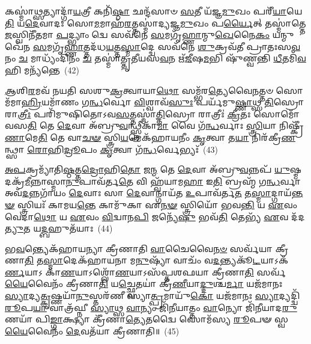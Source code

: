 𑌕𑌸𑍍𑌮𑌾॑\-\ul{𑌥𑍍𑌸}\-𑌤𑍍𑌯𑌾𑌦𑍍𑌗𑌾᳴\-\ul{𑌯}\-𑌤𑍍𑌰𑍀 𑌕𑌨𑌿᳴\-\ul{𑌷𑍍𑌠𑌾} 𑌛𑌨𑍍𑌦᳴𑌸𑌾𑍞 \ul{𑌸}\-𑌤𑍀 𑌯᳴𑌜𑍍𑌞\-\ul{𑌮𑍁}\-𑌖𑌂 𑌪𑌰𑍀᳴\-\ul{𑌯𑌾}\-𑌯𑍇\-\ul{𑌤𑌿} 𑌯\-\ul{𑌦𑍇}\-𑌵𑌾𑌦𑌃 𑌸𑍋\-\ul{𑌮}\-𑌮𑌾𑌹᳴\-\ul{𑌰}\-𑌤𑍍𑌤𑌸𑍍𑌮𑌾॑𑌦𑍍𑌯𑌜𑍍𑌞\-\ul{𑌮𑍁}\-𑌖𑌂 𑌪\-\ul{𑌰𑍍𑌯𑍈}\-𑌤𑍍 𑌤𑌸𑍍𑌮𑌾॑𑌤𑍍𑌤𑍇\-\ul{𑌜}\-𑌸𑍍𑌵𑌿𑌨𑍀᳴𑌤𑌮𑌾 \ul{𑌪}\-𑌦𑍍𑌭𑍍𑌯𑌾𑌂 𑌦𑍍𑌵𑍇 𑌸𑌵᳴𑌨𑍇 \ul{𑌸}\-𑌮𑌗𑍃᳴\-\ul{𑌹𑍍𑌣𑌾}\-𑌨𑍍𑌮𑍁\-\ul{𑌖𑍇}\-𑌨𑍈\-\ul{𑌕𑌂} 𑌯𑌨𑍍𑌮𑍁𑌖𑍇᳴𑌨 \ul{𑌸}\-𑌮𑌗𑍃᳴\-\ul{𑌹𑍍𑌣𑌾}\-𑌤𑍍𑌤𑌦᳴𑌧\-\ul{𑌯}\-𑌤𑍍𑌤\-\ul{𑌸𑍍𑌮𑌾}\-𑌦𑍍𑌦𑍍𑌵𑍇 𑌸𑌵᳴𑌨𑍇 \ul{𑌶𑍁}\-𑌕𑍍𑌰𑌵᳴𑌤𑍀 𑌪𑍍𑌰𑌾𑌤𑌃𑌸\-\ul{𑌵}\-𑌨𑌂 \ul{𑌚} 𑌮𑌾𑌧𑍍𑌯𑌂᳴𑌦𑌿𑌨𑌂 \ul{𑌚} 𑌤𑌸𑍍𑌮𑌾॑𑌤𑍍𑌤𑍃𑌤𑍀𑌯𑌸\-\ul{𑌵}\-𑌨 𑌋᳴\-\ul{𑌜𑍀}\-𑌷\-\ul{𑌮}\-𑌭𑌿 𑌷𑍁᳴𑌣𑍍𑌵𑌨𑍍𑌤𑌿 \ul{𑌧𑍀}\-𑌤𑌮𑌿᳴\-\ul{𑌵} 𑌹𑌿 𑌮𑌨𑍍𑌯᳴𑌨𑍍𑌤𑍇~(42)

\-\ul{𑌆}\-𑌶𑌿\-\ul{𑌰}\-𑌮𑌵᳴ 𑌨𑌯𑌤𑌿 𑌸𑌶𑍁\-\ul{𑌕𑍍𑌰}\-𑌤𑍍𑌵𑌾𑌯𑌾\-\ul{𑌥𑍋} 𑌸𑌮𑍍𑌭᳴𑌰\-\ul{𑌤𑍍𑌯𑍇}\-𑌵𑍈\-\ul{𑌨}\-𑌤𑍍𑌤𑍞 𑌸𑍋𑌮᳴𑌮𑌾\-\ul{𑌹𑍍𑌰𑌿}\-𑌯𑌮𑌾᳴𑌣𑌂 𑌗\-\ul{𑌨𑍍𑌧}\-𑌰𑍍𑌵𑍋 \ul{𑌵𑌿}\-𑌶𑍍𑌵𑌾𑌵᳴\-\ul{𑌸𑍁𑌃} 𑌪𑌰𑍍𑌯᳴𑌮𑍁\-\ul{𑌷𑍍𑌣𑌾}\-𑌥𑍍𑌸 \ul{𑌤𑌿}\-𑌸𑍍𑌰𑍋 𑌰𑌾\-\ul{𑌤𑍍𑌰𑍀𑌃} 𑌪𑌰𑌿᳴𑌮𑍁𑌷𑌿𑌤𑍋\-𑌽𑌵\-\ul{𑌸}\-𑌤𑍍𑌤𑌸𑍍𑌮𑌾॑\-\ul{𑌤𑍍𑌤𑌿}\-𑌸𑍍𑌰𑍋 𑌰𑌾𑌤𑍍𑌰𑍀𑌃॑ \ul{𑌕𑍍𑌰𑍀}\-𑌤𑌃 𑌸𑍋𑌮𑍋᳴ 𑌵𑌸\-\ul{𑌤𑌿} 𑌤𑍇 \ul{𑌦𑍇}\-𑌵𑌾 𑌅᳴𑌬𑍍𑌰𑍁\-\ul{𑌵}\-𑌨𑍍𑌥𑍍𑌸𑍍𑌤𑍍𑌰𑍀𑌕𑌾᳴\-\ul{𑌮𑌾} 𑌵𑍈 𑌗᳴\-\ul{𑌨𑍍𑌧}\-𑌰𑍍𑌵𑌾𑌃 \ul{𑌸𑍍𑌤𑍍𑌰𑌿}\-𑌯𑌾 𑌨𑌿𑌷𑍍𑌕𑍍𑌰𑍀᳴\-\ul{𑌣𑌾}\-𑌮𑍇\-\ul{𑌤𑌿} 𑌤𑍇 𑌵𑌾\-\ul{𑌚}\-\-\ul{𑍟} 𑌸𑍍𑌤𑍍𑌰𑌿\-\ul{𑌯}\-𑌮𑍇𑌕᳴𑌹𑌾𑌯𑌨𑍀𑌂 \ul{𑌕𑍃}\-𑌤𑍍𑌵𑌾 𑌤\-\ul{𑌯𑌾} 𑌨𑌿𑌰᳴𑌕𑍍𑌰𑍀\-\ul{𑌣}\-𑌨𑍍𑌥𑍍𑌸𑌾 \ul{𑌰𑍋}\-𑌹𑌿\-\ul{𑌦𑍍𑌰𑍂}\-𑌪𑌂 \ul{𑌕𑍃}\-𑌤𑍍𑌵𑌾 𑌗᳴\-\ul{𑌨𑍍𑌧}\-𑌰𑍍𑌵𑍇𑌭𑍍𑌯𑌃᳴~(43)

\-\ul{𑌅}\-\-\ul{𑌪}\-𑌕𑍍𑌰𑌮𑍍𑌯𑌾᳴𑌤𑌿\-\ul{𑌷𑍍𑌠}\-𑌤𑍍𑌤\-\ul{𑌦𑍍𑌰𑍋}\-𑌹𑌿\-\ul{𑌤𑍋} 𑌜\-\ul{𑌨𑍍𑌮} 𑌤𑍇 \ul{𑌦𑍇}\-𑌵𑌾 𑌅᳴𑌬𑍍𑌰𑍁\-\ul{𑌵}\-𑌨𑍍𑌨𑌪᳴ \ul{𑌯𑍁}\-𑌷𑍍𑌮𑌦𑌕𑍍𑌰᳴\-\ul{𑌮𑍀}\-𑌨𑍍𑌨𑌾𑌸𑍍𑌮𑌾\-\ul{𑌨𑍁}\-𑌪𑌾𑌵᳴𑌰𑍍𑌤\-\ul{𑌤𑍇} 𑌵𑌿 𑌹𑍍𑌵᳴𑌯𑌾𑌮\-\ul{𑌹𑌾} 𑌇\-\ul{𑌤𑌿} 𑌬𑍍𑌰𑌹𑍍𑌮᳴ 𑌗\-\ul{𑌨𑍍𑌧}\-𑌰𑍍𑌵𑌾 𑌅𑌵᳴\-\ul{𑌦}\-𑌨𑍍𑌨𑌗𑌾᳴𑌯𑌂 \ul{𑌦𑍇}\-𑌵𑌾𑌃 𑌸𑌾 \ul{𑌦𑍇}\-𑌵𑌾𑌨𑍍𑌗𑌾𑌯᳴𑌤 \ul{𑌉}\-𑌪𑌾𑌵᳴𑌰𑍍𑌤\-\ul{𑌤} 𑌤\-\ul{𑌸𑍍𑌮𑌾}\-𑌦𑍍𑌗𑌾𑌯᳴\-\ul{𑌨𑍍𑌤}\-\-\ul{𑍟} 𑌸𑍍𑌤𑍍𑌰𑌿𑌯𑌃᳴ 𑌕𑌾𑌮𑌯\-\ul{𑌨𑍍𑌤𑍇} 𑌕𑌾𑌮𑍁᳴𑌕𑌾 𑌏\-\ul{𑌨}\-\-\ul{𑍟} 𑌸𑍍𑌤𑍍𑌰𑌿𑌯𑍋᳴ 𑌭𑌵\-\ul{𑌨𑍍𑌤𑌿} 𑌯 \ul{𑌏}\-𑌵𑌂 𑌵𑍇𑌦𑌾\-\ul{𑌥𑍋} 𑌯 \ul{𑌏}\-𑌵𑌂 \ul{𑌵𑌿}\-𑌦𑍍𑌵𑌾𑌨\-\ul{𑌪𑌿} 𑌜𑌨𑍍𑌯𑍇᳴\-\ul{𑌷𑍁} 𑌭𑌵᳴\-\ul{𑌤𑌿} 𑌤𑍇𑌭𑍍𑌯᳴ \ul{𑌏}\-𑌵 𑌦᳴𑌦\-\ul{𑌤𑍍𑌯𑍁}\-𑌤 𑌯\-\ul{𑌦𑍍𑌬}\-𑌹𑍁𑌤᳴𑌯𑌾𑌃~(44)

𑌭\-\ul{𑌵}\-𑌨𑍍𑌤𑍍𑌯𑍇𑌕᳴𑌹𑌾𑌯𑌨𑍍𑌯𑌾 𑌕𑍍𑌰𑍀𑌣𑌾𑌤𑌿 \ul{𑌵𑌾}\-𑌚𑍈𑌵𑍈\-\ul{𑌨}\-\-\ul{𑍞} 𑌸𑌰𑍍𑌵᳴𑌯𑌾 𑌕𑍍𑌰𑍀𑌣𑌾\-\ul{𑌤𑌿} 𑌤\-\ul{𑌸𑍍𑌮𑌾}\-𑌦𑍇𑌕᳴𑌹𑌾𑌯𑌨𑌾 𑌮\-\ul{𑌨𑍁}\-𑌷𑍍𑌯𑌾᳴ 𑌵𑌾𑌚𑌂᳴ 𑌵\-\ul{𑌦}\-𑌨𑍍𑌤𑍍𑌯𑌕𑍂᳴\-\ul{𑌟}\-𑌯𑌾\-𑌽𑌕᳴\-\ul{𑌰𑍍𑌣}\-𑌯𑌾\-𑌽 𑌕𑌾᳴\-\ul{𑌣}\-𑌯𑌾\-𑌽𑌶𑍍𑌲𑍋᳴\-\ul{𑌣}\-𑌯𑌾\-𑌽𑌸᳴𑌪𑍍𑌤𑌶𑌫𑌯𑌾 𑌕𑍍𑌰𑍀𑌣𑌾\-\ul{𑌤𑌿} 𑌸𑌰𑍍𑌵᳴\-\ul{𑌯𑍈}\-𑌵𑍈𑌨𑌂᳴ 𑌕𑍍𑌰𑍀𑌣𑌾\-\ul{𑌤𑌿} 𑌯\-\ul{𑌚𑍍𑌛𑍍𑌵𑍇}\-𑌤𑌯𑌾॑ 𑌕𑍍𑌰𑍀\-\ul{𑌣𑍀}\-𑌯𑌾\-\ul{𑌦𑍍𑌦𑍁}\-𑌶𑍍𑌚\-\ul{𑌰𑍍𑌮𑌾} 𑌯𑌜᳴𑌮𑌾𑌨𑌃 \ul{𑌸𑍍𑌯𑌾}\-𑌦𑍍𑌯\-\ul{𑌤𑍍𑌕𑍃}\-𑌷𑍍𑌣𑌯𑌾᳴\-\ul{𑌨𑍁}\-𑌸𑍍𑌤𑌰᳴𑌣𑍀 𑌸𑍍𑌯𑌾\-\ul{𑌤𑍍𑌪𑍍𑌰}\-𑌮𑌾𑌯𑍁᳴\-\ul{𑌕𑍋} 𑌯𑌜᳴𑌮𑌾𑌨𑌃 \ul{𑌸𑍍𑌯𑌾}\-𑌦𑍍𑌯𑌦𑍍𑌦𑍍𑌵𑌿᳴\-\ul{𑌰𑍂}\-𑌪\-\ul{𑌯𑌾} 𑌵𑌾𑌤𑍍𑌰᳴𑌘𑍍𑌨𑍀 \ul{𑌸𑍍𑌯𑌾}\-𑌥𑍍𑌸 \ul{𑌵𑌾}\-𑌨𑍍𑌯𑌂 𑌜𑌿᳴\-\ul{𑌨𑍀}\-𑌯𑌾𑌤𑍍𑌤𑌂 \ul{𑌵𑌾}\-𑌨𑍍𑌯𑍋 𑌜𑌿᳴𑌨𑍀𑌯𑌾𑌦\-\ul{𑌰𑍁}\-𑌣𑌯𑌾᳴ 𑌪𑌿\-\ul{𑌙𑍍𑌗𑌾}\-𑌕𑍍𑌷𑍍𑌯𑌾 𑌕𑍍𑌰𑍀᳴𑌣𑌾\-\ul{𑌤𑍍𑌯𑍇}\-𑌤𑌦𑍍𑌵𑍈 𑌸𑍋𑌮᳴𑌸𑍍𑌯 \ul{𑌰𑍂}\-𑌪𑍟 𑌸𑍍𑌵\-\ul{𑌯𑍈}\-𑌵𑍈𑌨𑌂᳴ \ul{𑌦𑍇}\-𑌵𑌤᳴𑌯𑌾 𑌕𑍍𑌰𑍀𑌣𑌾𑌤𑌿॥~(45)

